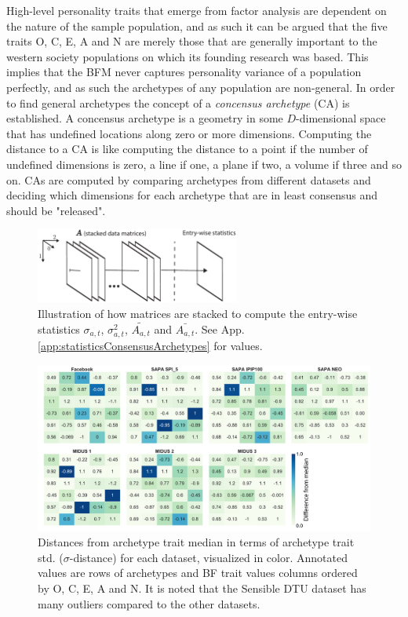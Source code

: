 High-level personality traits that emerge from factor analysis are dependent on the nature of the sample population, and as such it can be argued that the five traits O, C, E, A and N are merely those that are generally important to the western society populations on which its founding research was based. This implies that the BFM never captures personality variance of a population perfectly, and as such the archetypes of any population are non-general. In order to find general archetypes the concept of a \textit{concensus archetype} (CA) is established. A concensus archetype is a geometry in some $D$-dimensional space that has undefined locations along zero or more dimensions. Computing the distance to a CA is like computing the distance to a point if the number of undefined dimensions is zero, a line if one, a plane if two, a volume if three and so on. CAs are computed by comparing archetypes from different datasets and deciding which dimensions for each archetype that are in least consensus and should be "released".

\begin{figure}[h]
	\centering
	\includegraphics[width=0.6\textwidth]{figures/entryWiseStatistics}
	\caption{\label{fig:entryWiseStatistics}Illustration of how matrices are stacked to compute the entry-wise statistics $\sigma_{a,t}$, $\sigma_{a,t}^2$, $\tilde{A_{a,t}}$ and $\bar{A_{a,t}}$. See App. \ref{app:statisticsConsensusArchetypes} for values.}
\end{figure} 

\begin{figure}[h]
	\centering
	\includegraphics[width=\textwidth]{figures/medianDistances}
	\caption{\label{fig:medianDistances} Distances from archetype trait median in terms of archetype trait std. ($\sigma$-distance) for each dataset, visualized in color. Annotated values are rows of archetypes and BF trait values columns ordered by O, C, E, A and N. It is noted that the Sensible DTU dataset has many outliers compared to the other datasets.}
\end{figure}

